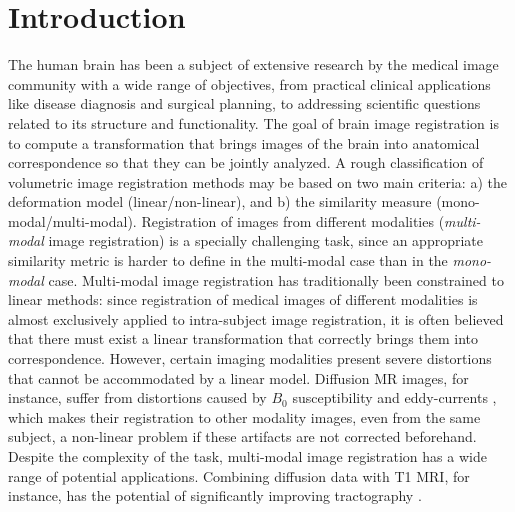 \section{Introduction}
The human brain has been a subject of extensive research by the medical image community with a wide range of objectives, from practical clinical applications like disease diagnosis and surgical planning, to addressing scientific questions related to its structure and functionality. The goal of brain image registration is to compute a transformation that brings images of the brain into anatomical correspondence so that they can be jointly analyzed. A rough classification of volumetric image registration methods may be based on two main criteria: a) the deformation model (linear/non-linear), and b) the similarity measure (mono-modal/multi-modal). Registration of images from different modalities (\emph{multi-modal} image registration) is a specially challenging task, since an appropriate similarity metric is harder to define in the multi-modal case than in the \emph{mono-modal} case. Multi-modal image registration has traditionally been constrained to linear methods: since registration of medical images of different modalities is almost exclusively applied to intra-subject image registration, it is often believed that there must exist a linear transformation that correctly brings them into correspondence. However, certain imaging modalities present severe distortions that cannot be accommodated by a linear model. Diffusion MR images, for instance, suffer from distortions caused by $B_{0}$ susceptibility and eddy-currents \citep{Tournier2011, Andersson2003}, which makes their registration to other modality images, even from the same subject, a non-linear problem if these artifacts are not corrected beforehand. Despite the complexity of the task, multi-modal image registration has a wide range of potential applications. Combining diffusion data with T1 MRI, for instance, has the potential of significantly improving tractography \citep{Smith2012, Girard2014}.

